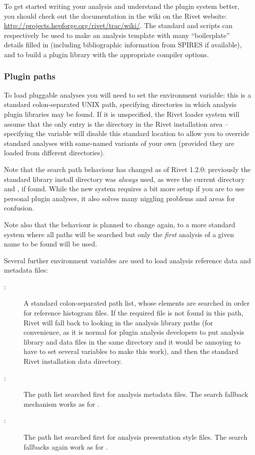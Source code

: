 \documentclass{JHEP3}
\begin{document}
To get started writing your analysis and understand the plugin system better,
you should check out the documentation in the wiki on the Rivet website:
\url{http://projects.hepforge.org/rivet/trac/wiki/}. The standard
 and  scripts can respectively be
used to make an analysis template with many ``boilerplate'' details filled in
(including bibliographic information from SPIRES if available), and to build a
plugin library with the appropriate compiler options.


\subsubsection{Plugin paths}

To load pluggable analyses you will need to set the 
environment variable: this is a standard colon-separated UNIX path, specifying
directories in which analysis plugin libraries may be found. If it is
unspecified, the Rivet loader system will assume that the only entry is the
 directory in the Rivet installation area -- specifying the variable
will disable this standard location to allow you to override standard analyses
with same-named variants of your own (provided they are loaded from different
directories).

\begin{change}
  Note that the search path behaviour has changed as of Rivet 1.2.0: previously
  the standard library install directory was \emph{always} used, as were the
  current directory and , if found. While the new system requires a
  bit more setup if you are to use personal plugin analyses, it also solves many
  niggling problems and areas for confusion.

  Note also that the behaviour is planned to change again, to a more standard
  system where all paths will be searched but only the \emph{first} analysis of
  a given name to be found will be used.
\end{change}

Several further environment variables are used to load analysis reference data
and metadata files:
\begin{description}
\item[:] A standard colon-separated path list, whose
  elements are searched in order for reference histogram files. If the required
  file is not found in this path, Rivet will fall back to looking in the
  analysis library paths (for convenience, as it is normal for plugin analysis
  developers to put analysis library and data files in the same directory and it
  would be annoying to have to set several variables to make this work), and
  then the standard Rivet installation data directory.
\item[:] The path list searched first for analysis
   metadata files. The search fallback mechanism works as for
  .
\item[:] The path list searched first for analysis
   presentation style files. The search fallbacks again work as for
  .
\end{description}
\end{document}
